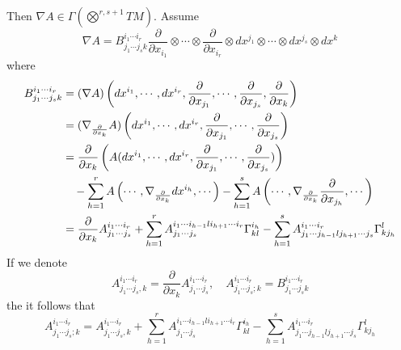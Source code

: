 Then $\nabla A \in \Gamma(\bigotimes^{r,s+1}TM)$. Assume
\begin{equation*}
	\nabla A = B^{i_1\cdots i_r}_{j_1\cdots j_s k}\frac{\partial}{\partial x_{i_1}}\otimes \cdots \otimes \frac{\partial}{\partial x_{i_r}}\otimes dx^{j_1}\otimes \cdots \otimes dx^{j_s} \otimes dx^k
\end{equation*}
where
\begin{equation*}
	\begin{aligned}
		B^{i_1 \cdots i_r}_{j_1 \cdots j_s k} &= (\nabla A)\left(dx^{i_1}, \cdots, dx^{i_r}, \frac{\partial}{\partial x_{j_1}}, \cdots , \frac{\partial}{\partial x_{j_s}}, \frac{\partial}{\partial x_{k}}\right) \\
		&= (\nabla_{\frac{\partial}{\partial x_{k}}} A)\left(dx^{i_1}, \cdots, dx^{i_r}, \frac{\partial}{\partial x_{j_1}}, \cdots , \frac{\partial}{\partial x_{j_s}}\right) \\
		&= \frac{\partial}{\partial x_{k}}\left(A(dx^{i_1}, \cdots, dx^{i_r}, \frac{\partial}{\partial x_{j_1}}, \cdots , \frac{\partial}{\partial x_{j_s}})\right) \\
		&\quad - \sum_{h=1}^r A\left(\cdots,\nabla_{\frac{\partial}{\partial x_{k}}} dx^{i_h},\cdots\right) - \sum_{h=1}^s A\left(\cdots,\nabla_{\frac{\partial}{\partial x_{k}}} \frac{\partial}{\partial x_{j_h}},\cdots\right) \\
		&= \frac{\partial}{\partial x_{k}}A^{i_1 \cdots i_r}_{j_1 \cdots j_s} + \sum_{h=1}^r A^{i_1 \cdots i_{h-1} l i_{h+1}  \cdots i_r}_{j_1 \cdots j_s}\Gamma^{i_h}_{kl}-\sum_{h=1}^sA^{i_1 \cdots i_r}_{j_1 \cdots j_{h-1}lj_{h+1} \cdots j_s}\Gamma^l_{kj_h}
	\end{aligned}
\end{equation*}
If we denote
\begin{equation*}
	A^{i_1 \cdots i_r}_{j_1 \cdots j_s,k} = \frac{\partial}{\partial x_{k}}A^{i_1 \cdots i_r}_{j_1 \cdots j_s},\quad A^{i_1 \cdots i_r}_{j_1 \cdots j_s;k} = B^{i_1 \cdots i_r}_{j_1 \cdots j_s k}
\end{equation*}
the it follows that
\begin{equation*}
	A^{i_1 \cdots i_r}_{j_1 \cdots j_s;k} = A^{i_1 \cdots i_r}_{j_1 \cdots j_s,k}+ \sum_{h=1}^r A^{i_1 \cdots i_{h-1} l i_{h+1}  \cdots i_r}_{j_1 \cdots j_s}\Gamma^{i_h}_{kl}-\sum_{h=1}^sA^{i_1 \cdots i_r}_{j_1 \cdots j_{h-1}lj_{h+1} \cdots j_s}\Gamma^l_{kj_h}
\end{equation*}

